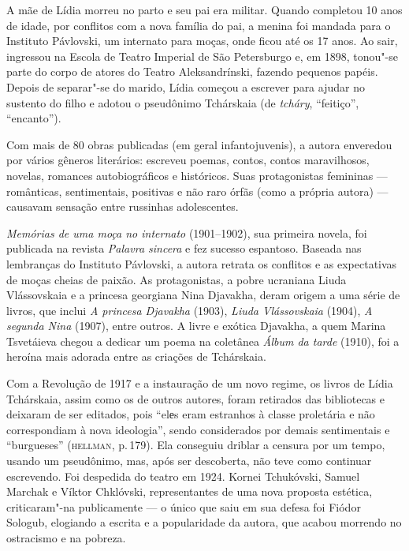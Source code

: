 {A mãe de Lídia morreu no parto e seu pai era militar. Quando completou
10 anos de idade, por conflitos com a nova família do pai, a menina foi
mandada para o Instituto Pávlovski, um internato para moças, onde ficou
até os 17 anos. Ao sair, ingressou na Escola de Teatro Imperial de São
Petersburgo e, em 1898, tonou"-se parte do corpo de atores do Teatro
Aleksandrínski, fazendo pequenos papéis. Depois de separar"-se do marido,
Lídia começou a escrever para ajudar no sustento do filho e adotou o
pseudônimo Tchárskaia (de \emph{tcháry}, ``feitiço'', ``encanto'').

Com mais de 80 obras publicadas (em geral infantojuvenis), a autora
enveredou por vários gêneros literários: escreveu poemas, contos, contos
maravilhosos, novelas, romances autobiográficos e históricos. Suas
protagonistas femininas --- românticas, sentimentais, positivas e não
raro órfãs (como a própria autora) --- causavam sensação entre russinhas
adolescentes.

\emph{Memórias de uma moça no internato} (1901--1902), sua primeira
novela, foi publicada na revista \emph{Palavra sincera} e fez sucesso
espantoso. Baseada nas lembranças do Instituto Pávlovski, a autora
retrata os conflitos e as expectativas de moças cheias de paixão. As
protagonistas, a pobre ucraniana Liuda Vlássovskaia e a princesa
georgiana Nina Djavakha, deram origem a uma série de livros, que inclui
\emph{A princesa Djavakha} (1903), \emph{Liuda Vlássovskaia} (1904),
\emph{A segunda Nina} (1907), entre outros. A livre e exótica Djavakha,
a quem Marina Tsvetáieva chegou a dedicar um poema na coletânea
\emph{Álbum da tarde} (1910), foi a heroína mais adorada entre as
criações de Tchárskaia.

Com a Revolução de 1917 e a instauração de um novo regime, os livros de
Lídia Tchárskaia, assim como os de outros autores, foram retirados das
bibliotecas e deixaram de ser editados, pois ``elеs eram estranhos à
classe proletária e não correspondiam à nova ideologia'', sendo
considerados por demais sentimentais e ``burgueses'' (\textsc{hellman}, p.\,179).
Ela conseguiu driblar a censura por um tempo, usando um pseudônimo, mas,
após ser descoberta, não teve como continuar escrevendo. Foi
despedida do teatro em 1924. Kornei Tchukóvski, Samuel Marchak e Víktor
Chklóvski, representantes de uma nova proposta estética, criticaram"-na
publicamente --- o único que saiu em sua defesa foi Fiódor Sologub,
elogiando a escrita e a popularidade da autora, que acabou morrendo no
ostracismo e na pobreza.

}

